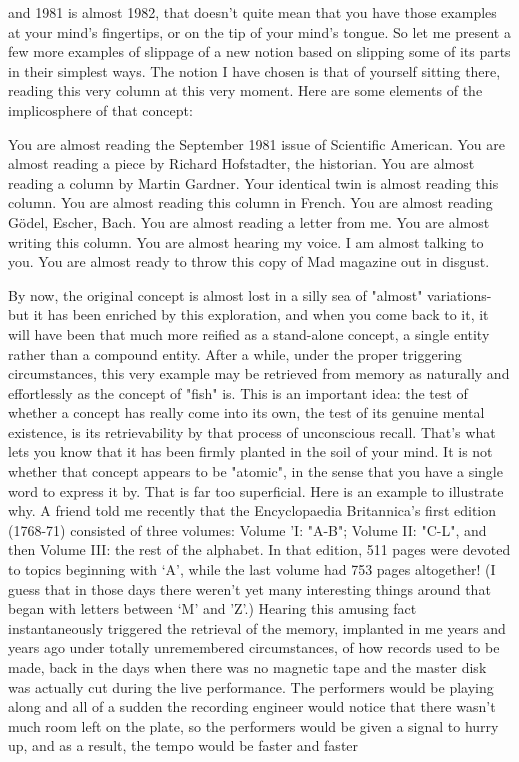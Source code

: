 and 1981 is almost 1982, that doesn't quite mean that you have those examples at your
mind's fingertips, or on the tip of your mind's tongue. So let me present a few more
examples of slippage of a new notion based on slipping some of its parts in their
simplest ways. The notion I have chosen is that of yourself sitting there, reading this
very column at this very moment. Here are some elements of the implicosphere of
that concept:

       You are almost reading the September 1981 issue of Scientific American.
       You are almost reading a piece by Richard Hofstadter, the historian.
       You are almost reading a column by Martin Gardner.
       Your identical twin is almost reading this column.
       You are almost reading this column in French.
       You are almost reading Gödel, Escher, Bach.
       You are almost reading a letter from me.
       You are almost writing this column.
       You are almost hearing my voice.
       I am almost talking to you.
       You are almost ready to throw this copy of Mad magazine out in disgust.

         By now, the original concept is almost lost in a silly sea of "almost"
variations-but it has been enriched by this exploration, and when you come back to it,
it will have been that much more reified as a stand-alone concept, a single entity
rather than a compound entity. After a while, under the proper triggering
circumstances, this very example may be retrieved from memory as naturally and
effortlessly as the concept of "fish" is.
         This is an important idea: the test of whether a concept has really come into its
own, the test of its genuine mental existence, is its retrievability by that process of
unconscious recall. That's what lets you know that it has been firmly planted in the
soil of your mind. It is not whether that concept appears to be "atomic", in the sense
that you have a single word to express it by. That is far too superficial.
         Here is an example to illustrate why. A friend told me recently that the
Encyclopaedia Britannica's first edition (1768-71) consisted of three volumes:
Volume 'I: "A-B"; Volume II: "C-L", and then Volume III: the rest of the alphabet. In
that edition, 511 pages were devoted to topics beginning with `A', while the last
volume had 753 pages altogether! (I guess that in those days there weren't yet many
interesting things around that began with letters between `M' and 'Z'.) Hearing this
amusing fact instantaneously triggered the retrieval of the memory, implanted in me
years and years ago under totally unremembered circumstances, of how records used
to be made, back in the days when there was no magnetic tape and the master disk
was actually cut during the live performance. The performers would be playing along
and all of a sudden the recording engineer would notice that there wasn't much room
left on the plate, so the performers would be given a signal to hurry up, and as a
result, the tempo would be faster and faster




